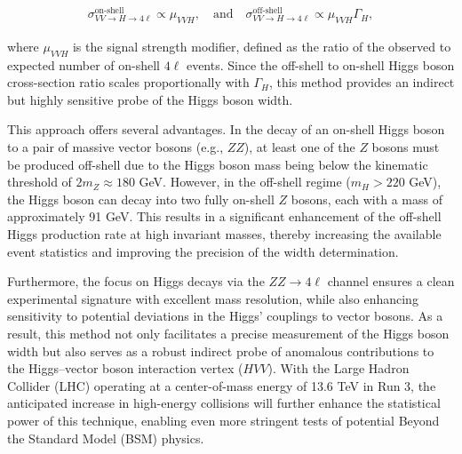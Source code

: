 \begin{equation}
\label{eq:resonant}
\begin{gathered}
\sigma^\text{on-shell}_{VV \to H \to 4\ell} \propto \mu_{VVH}, 
\quad\text{and}\quad
\sigma^\text{off-shell}_{VV \to H \to 4\ell} \propto \mu_{VVH} \Gamma_H,
\end{gathered}
\end{equation}

where \( \mu_{VVH} \) is the signal strength modifier, defined as the ratio of the observed to expected number of on-shell \( 4\ell \) events. Since the off-shell to on-shell Higgs boson cross-section ratio scales proportionally with \( \Gamma_H \), this method provides an indirect but highly sensitive probe of the Higgs boson width.

This approach offers several advantages. In the decay of an on-shell Higgs boson to a pair of massive vector bosons (e.g., \( ZZ \)), at least one of the \( Z \) bosons must be produced off-shell due to the Higgs boson mass being below the kinematic threshold of \( 2m_Z \approx 180 \) GeV. However, in the off-shell regime (\( m_H > 220 \) GeV), the Higgs boson can decay into two fully on-shell \( Z \) bosons, each with a mass of approximately 91 GeV. This results in a significant enhancement of the off-shell Higgs production rate at high invariant masses, thereby increasing the available event statistics and improving the precision of the width determination.

Furthermore, the focus on Higgs decays via the \( ZZ \to 4\ell \) channel ensures a clean experimental signature with excellent mass resolution, while also enhancing sensitivity to potential deviations in the Higgs' couplings to vector bosons. As a result, this method not only facilitates a precise measurement of the Higgs boson width but also serves as a robust indirect probe of anomalous contributions to the Higgs–vector boson interaction vertex (\( HVV \)). With the Large Hadron Collider (LHC) operating at a center-of-mass energy of 13.6 TeV in Run 3, the anticipated increase in high-energy collisions will further enhance the statistical power of this technique, enabling even more stringent tests of potential Beyond the Standard Model (BSM) physics.


